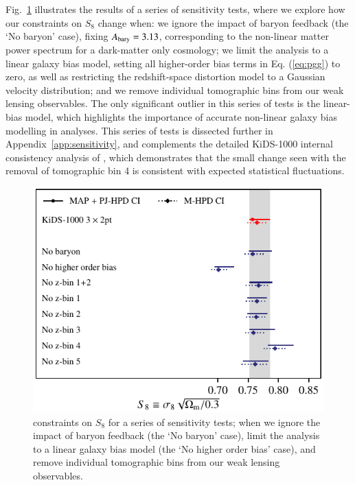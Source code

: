 Fig.~\ref{fig:S8comp_sensitivity} illustrates the results of a series of sensitivity tests, where we explore how our \tttp constraints on $S_8$ change when: 
we ignore the impact of baryon feedback (the `No baryon' case), fixing $A_{\rm bary}=3.13$, corresponding to the non-linear matter power spectrum for a dark-matter only cosmology; 
we limit the analysis to a linear galaxy bias model, setting all higher-order bias terms in Eq. (\ref{eq:pgg}) to zero, as well as restricting the redshift-space distortion model to a Gaussian velocity distribution; 
and we remove individual tomographic bins from our weak lensing observables. 
The only significant outlier in this series of tests is the linear-bias model, which highlights the importance of accurate non-linear galaxy bias modelling in \tttp analyses.     
This series of tests is dissected further in Appendix~\ref{app:sensitivity}, and complements the detailed KiDS-1000 internal consistency analysis of \citet{asgari/etal:inprep}, which demonstrates that the small change seen with the removal of tomographic bin 4 is consistent with expected statistical fluctuations.

\begin{figure}
	\begin{center}
		\includegraphics[width=\columnwidth]{Parameter_Plots/systematics/S8_comparison_blindC}
		\caption{\tttp constraints on $S_8$ for a series of sensitivity tests; when we ignore the impact of baryon feedback (the `No baryon' case), limit the analysis to a linear galaxy bias model (the `No higher order bias' case), and remove individual tomographic bins from our weak lensing observables.  
		\label{fig:S8comp_sensitivity}}
	\end{center}
\end{figure}

